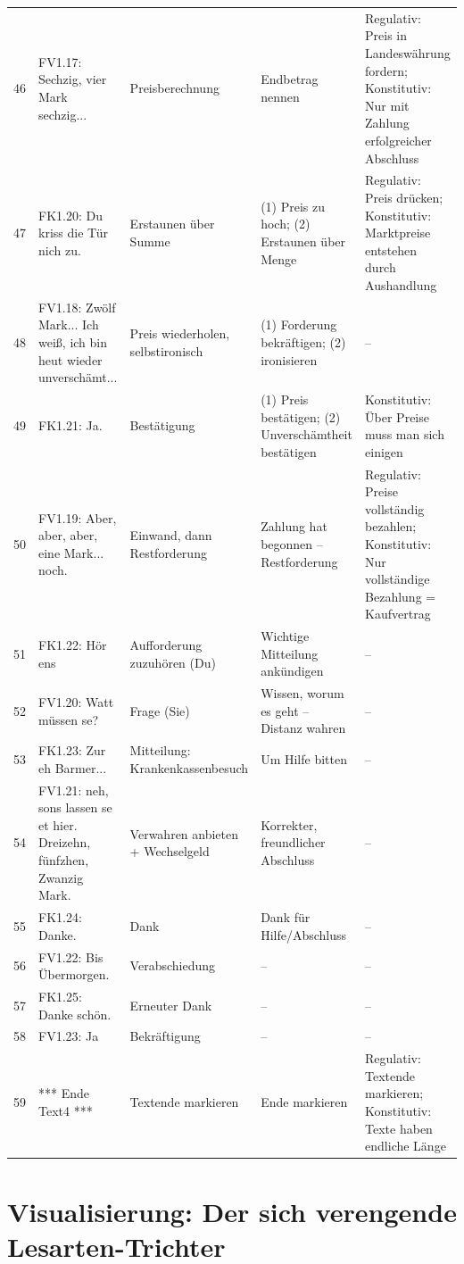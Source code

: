 \documentclass[11pt]{article}
\begin{document}
\begin{longtable}{p{0.8cm}|p{3.5cm}|p{3.5cm}|p{3cm}|p{3cm}}
46 & FV1.17: Sechzig, vier Mark sechzig... & Preisberechnung & Endbetrag nennen & Regulativ: Preis in Landeswährung fordern; Konstitutiv: Nur mit Zahlung erfolgreicher Abschluss \\
47 & FK1.20: Du kriss die Tür nich zu. & Erstaunen über Summe & (1) Preis zu hoch; (2) Erstaunen über Menge & Regulativ: Preis drücken; Konstitutiv: Marktpreise entstehen durch Aushandlung \\
48 & FV1.18: Zwölf Mark... Ich weiß, ich bin heut wieder unverschämt... & Preis wiederholen, selbstironisch & (1) Forderung bekräftigen; (2) ironisieren & – \\
49 & FK1.21: Ja. & Bestätigung & (1) Preis bestätigen; (2) Unverschämtheit bestätigen & Konstitutiv: Über Preise muss man sich einigen \\
50 & FV1.19: Aber, aber, aber, eine Mark... noch. & Einwand, dann Restforderung & Zahlung hat begonnen – Restforderung & Regulativ: Preise vollständig bezahlen; Konstitutiv: Nur vollständige Bezahlung = Kaufvertrag \\
51 & FK1.22: Hör ens & Aufforderung zuzuhören (Du) & Wichtige Mitteilung ankündigen & – \\
52 & FV1.20: Watt müssen se? & Frage (Sie) & Wissen, worum es geht – Distanz wahren & – \\
53 & FK1.23: Zur eh Barmer... & Mitteilung: Krankenkassenbesuch & Um Hilfe bitten & – \\
54 & FV1.21: neh, sons lassen se et hier. Dreizehn, fünfzhen, Zwanzig Mark. & Verwahren anbieten + Wechselgeld & Korrekter, freundlicher Abschluss & – \\
55 & FK1.24: Danke. & Dank & Dank für Hilfe/Abschluss & – \\
56 & FV1.22: Bis Übermorgen. & Verabschiedung & – & – \\
57 & FK1.25: Danke schön. & Erneuter Dank & – & – \\
58 & FV1.23: Ja & Bekräftigung & – & – \\
59 & *** Ende Text4 *** & Textende markieren & Ende markieren & Regulativ: Textende markieren; Konstitutiv: Texte haben endliche Länge \\
\hline
\end{longtable}

\newpage

\section{Visualisierung: Der sich verengende Lesarten-Trichter}
\end{document}
